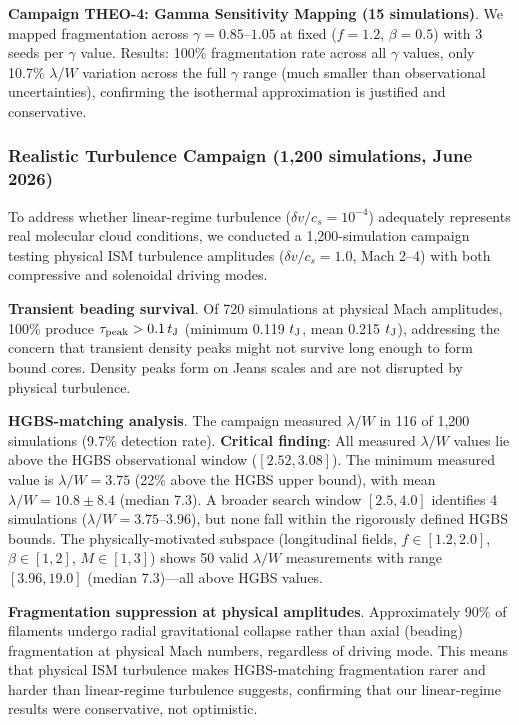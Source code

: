 \documentclass[twocolumn]{mnras}
\begin{document}
\textbf{Campaign THEO-4: Gamma Sensitivity Mapping (15 simulations)}. We mapped fragmentation across $\gamma = 0.85$--$1.05$ at fixed ($f = 1.2$, $\beta = 0.5$) with 3 seeds per $\gamma$ value. Results: 100\% fragmentation rate across all $\gamma$ values, only 10.7\% $\lambda/W$ variation across the full $\gamma$ range (much smaller than observational uncertainties), confirming the isothermal approximation is justified and conservative.

\subsubsection{Realistic Turbulence Campaign (1,200 simulations, June 2026)}
\label{sec:rtc}

To address whether linear-regime turbulence ($\delta v/c_s = 10^{-4}$) adequately represents real molecular cloud conditions, we conducted a 1,200-simulation campaign testing physical ISM turbulence amplitudes ($\delta v/c_s = 1.0$, Mach 2--4) with both compressive and solenoidal driving modes.

\textbf{Transient beading survival}. Of 720 simulations at physical Mach amplitudes, 100\% produce $\tau_{\rm peak} > 0.1\,t_{\rm J}$ (minimum 0.119 $t_{\rm J}$, mean 0.215 $t_{\rm J}$), addressing the concern that transient density peaks might not survive long enough to form bound cores. Density peaks form on Jeans scales and are not disrupted by physical turbulence.

\textbf{HGBS-matching analysis}. The campaign measured $\lambda/W$ in 116 of 1,200 simulations (9.7\% detection rate). \textbf{Critical finding}: All measured $\lambda/W$ values lie above the HGBS observational window ($[2.52, 3.08]$). The minimum measured value is $\lambda/W = 3.75$ (22\% above the HGBS upper bound), with mean $\lambda/W = 10.8 \pm 8.4$ (median 7.3). A broader search window $[2.5, 4.0]$ identifies 4 simulations ($\lambda/W = 3.75$--$3.96$), but none fall within the rigorously defined HGBS bounds. The physically-motivated subspace (longitudinal fields, $f \in [1.2, 2.0]$, $\beta \in [1, 2]$, $M \in [1, 3]$) shows 50 valid $\lambda/W$ measurements with range $[3.96, 19.0]$ (median 7.3)—all above HGBS values.

\textbf{Fragmentation suppression at physical amplitudes}. Approximately 90\% of filaments undergo radial gravitational collapse rather than axial (beading) fragmentation at physical Mach numbers, regardless of driving mode. This means that physical ISM turbulence makes HGBS-matching fragmentation rarer and harder than linear-regime turbulence suggests, confirming that our linear-regime results were conservative, not optimistic.
\end{document}

